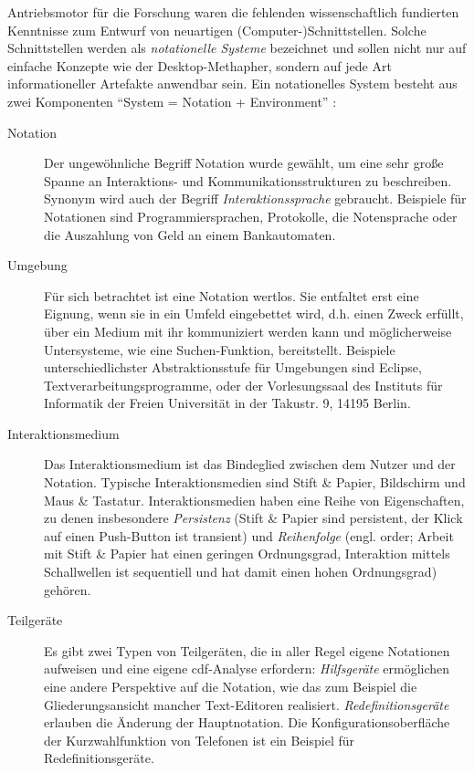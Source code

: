 \begin{important}
Antriebsmotor für die Forschung waren die fehlenden wissenschaftlich fundierten Kenntnisse zum Entwurf von neuartigen (Computer-)Schnittstellen. Solche Schnittstellen werden als \emph{notationelle Systeme} bezeichnet und sollen nicht nur auf einfache Konzepte wie der Desktop-Methapher, sondern auf jede Art informationeller Artefakte anwendbar sein. Ein notationelles System besteht aus zwei Komponenten ``System = Notation + Environment'' \citep[genauer in \cite{carroll2003hci}]{Green:1989wb,AnIntroductiontot:1996ux}:
\begin{description}
\item[Notation] Der ungewöhnliche Begriff Notation wurde gewählt, um eine sehr große Spanne an Interaktions- und Kommunikationsstrukturen zu beschreiben. Synonym wird auch der Begriff \emph{Interaktionssprache} gebraucht. Beispiele für Notationen sind Programmiersprachen, Protokolle, die Notensprache oder die Auszahlung von Geld an einem Bankautomaten.
\item[Umgebung] Für sich betrachtet ist eine Notation wertlos. Sie entfaltet erst eine Eignung, wenn sie in ein Umfeld eingebettet wird, d.h. einen Zweck erfüllt, über ein Medium mit ihr kommuniziert werden kann und möglicherweise Untersysteme, wie eine Suchen-Funktion, bereitstellt. Beispiele unterschiedlichster Abstraktionsstufe für Umgebungen sind Eclipse, Textverarbeitungsprogramme, oder der Vorlesungssaal des Instituts für Informatik der Freien Universität in der Takustr. 9, 14195 Berlin.
\item[Interaktionsmedium] Das Interaktionsmedium ist das Bindeglied zwischen dem Nutzer und der Notation. Typische Interaktionsmedien sind Stift \& Papier, Bildschirm und Maus \& Tastatur. Interaktionsmedien haben eine Reihe von Eigenschaften, zu denen insbesondere \emph{Persistenz} (Stift \& Papier sind persistent, der Klick auf einen Push-Button ist transient) und \emph{Reihenfolge} (engl. order; Arbeit mit Stift \& Papier hat einen geringen Ordnungsgrad, Interaktion mittels Schallwellen ist sequentiell und hat damit einen hohen Ordnungsgrad) gehören.
\item[Teilgeräte] \label{sec:cdf-helper-devices} Es gibt zwei Typen von Teilgeräten, die in aller Regel eigene Notationen aufweisen und eine eigene \gls{cdf}-Analyse erfordern: \emph{Hilfsgeräte} ermöglichen eine andere Perspektive auf die Notation, wie das zum Beispiel die Gliederungsansicht mancher Text-Editoren realisiert. \emph{Redefinitionsgeräte} erlauben die Änderung der Hauptnotation. Die Konfigurationsoberfläche der Kurzwahlfunktion von Telefonen ist ein Beispiel für Redefinitionsgeräte. 
\end{description}


\end{important}
